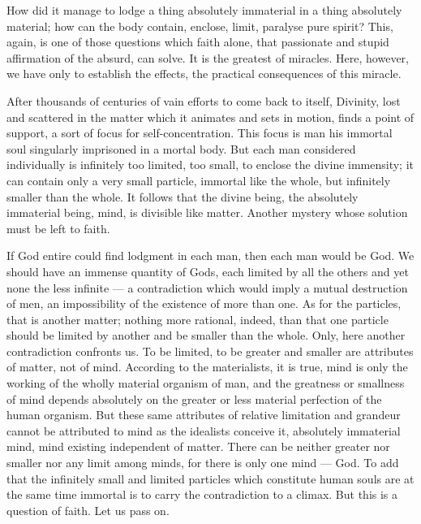 \documentclass[12pt]{report}
\begin{document}
How did it manage to lodge a thing absolutely immaterial in a thing absolutely material; how can the body contain, enclose, limit, paralyse pure spirit? This, again, is one of those questions which faith alone, that passionate and stupid affirmation of the absurd, can solve. It is the greatest of miracles. Here, however, we have only to establish the effects, the practical consequences of this miracle.


After thousands of centuries of vain efforts to come back to itself, Divinity, lost and scattered in the matter which it animates and sets in motion, finds a point of support, a sort of focus for self-concentration. This focus is man his immortal soul singularly imprisoned in a mortal body. But each man considered individually is infinitely too limited, too small, to enclose the divine immensity; it can contain only a very small particle, immortal like the whole, but infinitely smaller than the whole. It follows that the divine being, the absolutely immaterial being, mind, is divisible like matter. Another mystery whose solution must be left to faith.


If God entire could find lodgment in each man, then each man would be God. We should have an immense quantity of Gods, each limited by all the others and yet none the less infinite — a contradiction which would imply a mutual destruction of men, an impossibility of the existence of more than one. As for the particles, that is another matter; nothing more rational, indeed, than that one particle should be limited by another and be smaller than the whole. Only, here another contradiction confronts us. To be limited, to be greater and smaller are attributes of matter, not of mind. According to the materialists, it is true, mind is only the working of the wholly material organism of man, and the greatness or smallness of mind depends absolutely on the greater or less material perfection of the human organism. But these same attributes of relative limitation and grandeur cannot be attributed to mind as the idealists conceive it, absolutely immaterial mind, mind existing independent of matter. There can be neither greater nor smaller nor any limit among minds, for there is only one mind — God. To add that the infinitely small and limited particles which constitute human souls are at the same time immortal is to carry the contradiction to a climax. But this is a question of faith. Let us pass on.
\end{document}
